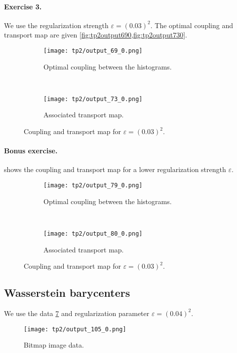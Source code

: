\documentclass{article}
\renewcommand{\epsilon}{\varepsilon}
\numberwithin{equation}{section}
\theoremstyle{definition}
\begin{document}
\paragraph{Exercise 3.} We use the regularization strength $\epsilon = (0.03)^2$. The optimal coupling and transport map are given \cref{fig:tp2output690,fig:tp2output730}.
\begin{figure}[!h]
	\begin{subfigure}{.49\linewidth}
		\centering
		\texttt{[image: tp2/output\_69\_0.png]}
		\caption{Optimal coupling between the histograms.}
		\label{fig:tp2output690}	
	\end{subfigure}~
	\begin{subfigure}{.49\linewidth}
		\centering
		\texttt{[image: tp2/output\_73\_0.png]}
		\caption{Associated transport map.}
		\label{fig:tp2output730}	
	\end{subfigure}
	\caption{Coupling and transport map for $\epsilon = (0.03)^2$.}\label{fig:HistoCoupling}
\end{figure}

\paragraph{Bonus exercise.}  shows the coupling and transport map for a lower regularization strength $\epsilon$.
\begin{figure}[!h]
	\begin{subfigure}[t]{.49\linewidth}
		\centering
		\texttt{[image: tp2/output\_79\_0.png]}
		\caption{Optimal coupling between the histograms.}
		\label{fig:tp2output790}	
	\end{subfigure}~
	\begin{subfigure}[t]{.49\linewidth}
		\centering
		\texttt{[image: tp2/output\_80\_0.png]}
		\caption{Associated transport map.}
		\label{fig:tp2output800}	
	\end{subfigure}
	\caption{Coupling and transport map for $\epsilon = (0.03)^2$.}\label{fig:HistoCouplingLowerReg}
\end{figure}



\subsection{Wasserstein barycenters}

We use the data \cref{fig:tp2output1050} and regularization parameter $\epsilon = (0.04)^2$.
\begin{figure}[!h]
	\centering
	\texttt{[image: tp2/output\_105\_0.png]}\caption{Bitmap image data.}
	\label{fig:tp2output1050}
\end{figure}
\end{document}
